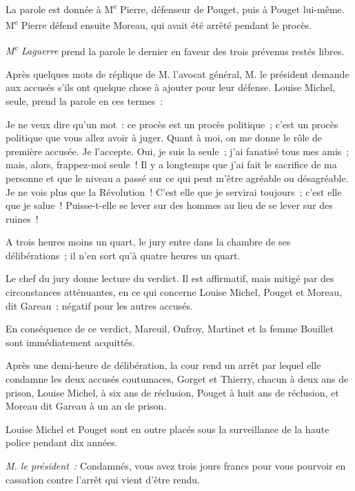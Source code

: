 \documentclass[french,twoside]{book} %
\def\mednobreak{\ifdim\lastskip<\medskipamount
  \removelastskip\nopagebreak\medskip\fi}
\newcommand{\labelblock}[1]{\medbreak{\noindent\color{rubric}\bfseries #1}\par\mednobreak}
\begin{document}
\labelblock{\emph{Audience du} 23 \emph{juin}.}

\noindent La parole est donnée à M\textsuperscript{e} Pierre, défenseur de Pouget, puis à Pouget lui-même. M\textsuperscript{e} Pierre défend ensuite Moreau, qui avait été arrêté pendant le procès.\par
\bigbreak
\noindent \emph{M\textsuperscript{e} Laguerre} prend la parole le dernier en faveur des trois prévenus restés libres.\par
\bigbreak
\noindent Après quelques mots de réplique de M. l’avocat général, M. le président demande aux accusés s’ils ont quelque chose à ajouter pour leur défense. Louise Michel, seule, prend la parole en ces termes :\par
\bigbreak
\noindent Je ne veux dire qu’un mot : ce procès est un procès politique ; c’est un procès politique que vous allez avoir à juger. Quant à moi, on me donne le rôle de première accusée. Je l’accepte. Oui, je suis la seule ; j’ai fanatisé tous mes amis ; mais, alors, frappez-moi seule ! Il y a longtemps que j’ai fait le sacrifice de ma personne et que le niveau a passé sur ce qui peut m’être agréable ou désagréable. Je ne vois plus que la Révolution ! C’est elle que je servirai toujours ; c’est elle que  je salue ! Puisse-t-elle se lever sur des hommes au lieu de se lever sur des ruines !\par
\bigbreak
\noindent A trois heures moins un quart, le jury entre dans la chambre de ses délibérations ; il n’en sort qu’à quatre heures un quart.\par
\bigbreak
\noindent Le chef du jury donne lecture du verdict. Il est affirmatif, mais mitigé par des circonstances atténuantes, en ce qui concerne Louise Michel, Pouget et Moreau, dit Gareau ; négatif pour les autres accusés.\par
En conséquence de ce verdict, Mareuil, Onfroy, Martinet et la femme Bouillet sont immédiatement acquittés.\par
Après une demi-heure de délibération, la cour rend un arrêt par lequel elle condamne les deux accusés coutumaces, Gorget et Thierry, chacun à deux ans de prison, Louise Michel, à six ans de réclusion, Pouget à huit ans de réclusion, et Moreau dit Gareau à un an de prison.\par
Louise Michel et Pouget sont en outre placés sous la surveillance de la haute police pendant dix années.\par
\bigbreak
\noindent \emph{M. le président :} Condamnés, vous avez trois jours francs pour vous pourvoir en cassation contre l’arrêt qui vient d’être rendu.\par
\end{document}
